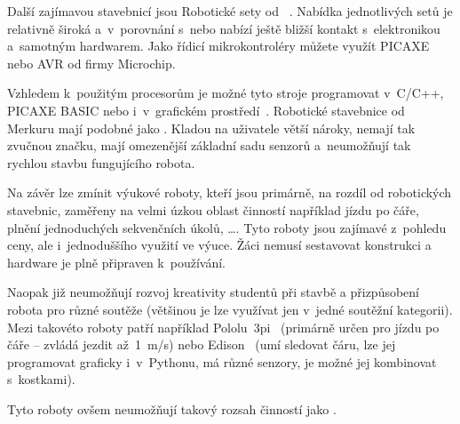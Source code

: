 
Další zajímavou stavebnicí jsou Robotické sety od ~\cite{merkur_roboticsSetsEshop}. 
Nabídka jednotlivých setů je relativně široká a~v~porovnání s~\legoM{ }nebo \fischerT{ }nabízí ještě bližší kontakt s~elektronikou a~samotným hardwarem. 
Jako řídicí mikrokontroléry můžete využít PICAXE nebo AVR od firmy Microchip. 

Vzhledem k~použitým procesorům je možné tyto stroje programovat v~C/C++, PICAXE BASIC nebo i~v~grafickém prostředí~\cite{picaxeCz_BlocklyForPICAXE}. 
Robotické stavebnice od Merkuru mají podobné  jako \fischerT. 
Kladou na uživatele větší nároky, nemají tak zvučnou značku, mají omezenější základní sadu senzorů a~neumožňují tak rychlou stavbu fungujícího robota.

Na závěr lze zmínit výukové roboty, kteří jsou primárně, na rozdíl od robotických stavebnic, zaměřeny na velmi úzkou oblast činností například jízdu po čáře, plnění jednoduchých sekvenčních úkolů, \dots{}.  
Tyto roboty jsou zajímavé z~pohledu ceny, ale i~jednoduššího využití ve výuce. Žáci nemusí sestavovat konstrukci a hardware je plně připraven k~používání. 

Naopak již neumožňují rozvoj kreativity studentů při stavbě a přizpůsobení robota pro různé soutěže (většinou je lze využívat jen v~jedné soutěžní kategorii).  
Mezi takovéto roboty patří například Pololu~3pi~\cite{robotPololu3pi} (primárně určen pro jízdu po čáře -- zvládá jezdit až~1~m/s) nebo Edison~\cite{robotEdison} (umí sledovat čáru, lze jej programovat graficky i~v~Pythonu, má různé senzory, je možné jej kombinovat s~\lego{ }kostkami). 

Tyto roboty ovšem neumožňují takový rozsah činností jako \legoM.

